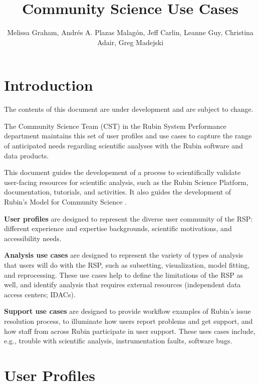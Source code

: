 \documentclass[DM,lsstdraft,authoryear,toc]{lsstdoc}
\title{Community Science Use Cases}
\author{%
Melissa Graham, Andrés A. Plazas Malagón, Jeff Carlin, Leanne Guy, Christina Adair, Greg Madejski
}
\date{\vcsDate}
\begin{document}
\maketitle


\section{Introduction}

The contents of this document are under development and are subject to change.

The Community Science Team (CST) in the Rubin System Performance department maintains this set of user profiles and use cases
to capture the range of anticipated needs regarding scientific analyses with the Rubin software and data products.

This document guides the developement of a process to scientifically validate user-facing resources for scientific analysis,
such as the Rubin Science Platform, documentation, tutorials, and activities.
It also guides the development of Rubin's Model for Community Science .

\textbf{User profiles} are designed to represent the diverse user community of the RSP:
different experience and expertise backgrounds, scientific motivations, and accessibility needs.

\textbf{Analysis use cases} are designed to represent the variety of types of analysis that
users will do with the RSP, such as subsetting, visualization, model fitting, and reprocessing.
These use cases help to define the limitations of the RSP as well, and identify analysis
that requires external resources (independent data access centers; IDACs).

\textbf{Support use cases} are designed to provide workflow examples of Rubin's issue resolution
process, to illuminate how users report problems and get support, and how staff from across
Rubin participate in user support.
These uses cases include, e.g., trouble with scientific analysis,
instrumentation faults, software bugs.

\clearpage
\section{User Profiles}
\end{document}
